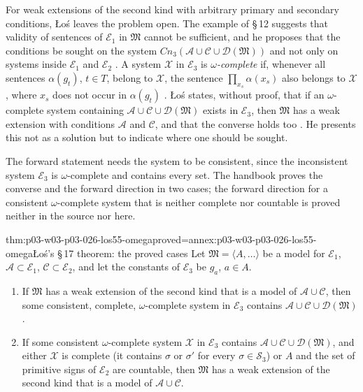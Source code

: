 For weak extensions of the second kind with arbitrary primary and secondary
conditions, \L o\'s leaves the problem open.  The example of \S\,12 suggests
that validity of sentences of \(\mathcal E_1\) in \(\mathfrak M\) cannot be
sufficient, and he proposes that the conditions be sought on the system
\(\mathit{Cn}_3(\mathcal A\cup\mathcal C\cup\mathcal D(\mathfrak M))\) and not
only on systems inside \(\mathcal E_1\) and \(\mathcal E_2\)
\cite[p.~53]{Los1955}.  A system \(\mathcal X\) in \(\mathcal E_3\) is
\emph{\(\omega\)-complete} if, whenever all sentences \(\alpha(g_t)\),
\(t\in T\), belong to \(\mathcal X\), the sentence
\(\prod_{x_s}\alpha(x_s)\) also belongs to \(\mathcal X\), where \(x_s\) does
not occur in \(\alpha(g_t)\) \cite[p.~54]{Los1955}.  \L o\'s states, without
proof, that if an \(\omega\)-complete system containing
\(\mathcal A\cup\mathcal C\cup\mathcal D(\mathfrak M)\) exists in
\(\mathcal E_3\), then \(\mathfrak M\) has a weak extension with conditions
\(\mathcal A\) and \(\mathcal C\), and that the converse holds too
\cite[pp.~53--54]{Los1955}.  He presents this not as a solution but to
indicate where one should be sought.

The forward statement needs the system to be consistent, since the
inconsistent system \(\mathcal E_3\) is \(\omega\)-complete and contains every
set.  The handbook proves the converse and the forward direction in two
cases; the forward direction for a consistent \(\omega\)-complete system that
is neither complete nor countable is proved neither in the source nor here.

\begin{hbtheorem}{thm:p03-w03-p03-026-los55-omega}{proved=annex:p03-w03-p03-026-los55-omega}{\L o\'s's \S\,17 theorem: the proved cases}
Let \(\mathfrak M=\langle A,\ldots\rangle\) be a model for \(\mathcal E_1\),
\(\mathcal A\subset\mathcal E_1\), \(\mathcal C\subset\mathcal E_2\), and let the
constants of \(\mathcal E_3\) be \(g_a\), \(a\in A\).
\begin{enumerate}
 \item If \(\mathfrak M\) has a weak extension of the second kind that is a
       model of \(\mathcal A\cup\mathcal C\), then some consistent, complete,
       \(\omega\)-complete system in \(\mathcal E_3\) contains
       \(\mathcal A\cup\mathcal C\cup\mathcal D(\mathfrak M)\).
 \item If some consistent \(\omega\)-complete system \(\mathcal X\) in
       \(\mathcal E_3\) contains \(\mathcal A\cup\mathcal C\cup\mathcal D(\mathfrak M)\),
       and either \(\mathcal X\) is complete (it contains \(\sigma\) or
       \(\sigma'\) for every \(\sigma\in\mathcal S_3\)) or \(A\) and the set of
       primitive signs of \(\mathcal E_2\) are countable, then \(\mathfrak M\)
       has a weak extension of the second kind that is a model of
       \(\mathcal A\cup\mathcal C\).
\end{enumerate}
\end{hbtheorem}


